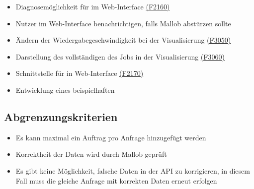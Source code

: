 \begin{itemize}[noitemsep]
        \item Diagnosemöglichkeit für  im \gls{Web-Interface} \hyperref[FA:Web-Interface:Filtern für Admins]{(F2160)}
        \item \gls{Nutzer} im \gls{Web-Interface} benachrichtigen, falls Mallob abstürzen sollte 
        \item Ändern der Wiedergabegeschwindigkeit bei der Visualisierung \hyperref[FA:Visualisierung:Aendern der Wiedergabegeschwindigkeit]{(F3050)}
        \item Darstellung des vollständigen  des Jobs in der Visualisierung \hyperref[FA:Visualisierung:Anzeigen des Binaerbaumes für einen Job]{(F3060)}
        \item Schnittstelle für  in \gls{Web-Interface} \hyperref[FA:Web-Interface:Anzeigen von Plugins]{(F2170)}
        \item Entwicklung eines beispielhaften 
    \end{itemize}
    
\subsection{Abgrenzungskriterien}
    \begin{itemize}[noitemsep]
        \item Es kann maximal ein Auftrag pro Anfrage hinzugefügt werden
        \item Korrektheit der Daten wird durch Mallob geprüft
        \item Es gibt keine Möglichkeit, falsche Daten in der \gls{API} zu korrigieren, in diesem Fall muss die gleiche Anfrage mit korrekten Daten erneut erfolgen
    \end{itemize}
